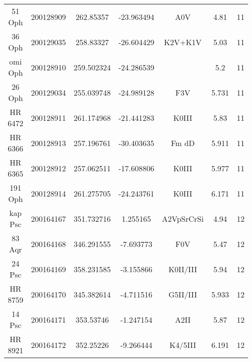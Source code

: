 \begin{table*}
\begin{tabular}{ccccccc}
51 Oph & 200128909 & 262.85357 & -23.963494 & A0V & 4.81 & 11 \\
36 Oph & 200129035 & 258.83327 & -26.604429 & K2V+K1V & 5.03 & 11 \\
omi Oph & 200128910 & 259.502324 & -24.286539 &  & 5.2 & 11 \\
26 Oph & 200129034 & 255.039748 & -24.989128 & F3V & 5.731 & 11 \\
HR 6472 & 200128911 & 261.174968 & -21.441283 & K0III & 5.83 & 11 \\
HR 6366 & 200128913 & 257.196761 & -30.403635 & Fm dD & 5.911 & 11 \\
HR 6365 & 200128912 & 257.062511 & -17.608806 & K0III & 5.977 & 11 \\
191 Oph & 200128914 & 261.275705 & -24.243761 & K0III & 6.171 & 11 \\
kap Psc & 200164167 & 351.732716 & 1.255165 & A2VpSrCrSi & 4.94 & 12 \\
83 Aqr & 200164168 & 346.291555 & -7.693773 & F0V & 5.47 & 12 \\
24 Psc & 200164169 & 358.231585 & -3.155866 & K0II/III & 5.94 & 12 \\
HR 8759 & 200164170 & 345.382614 & -4.711516 & G5II/III & 5.933 & 12 \\
14 Psc & 200164171 & 353.53746 & -1.247154 & A2II & 5.87 & 12 \\
HR 8921 & 200164172 & 352.25226 & -9.266444 & K4/5III & 6.191 & 12 \\
\hline
\end{tabular}
\end{table*}
